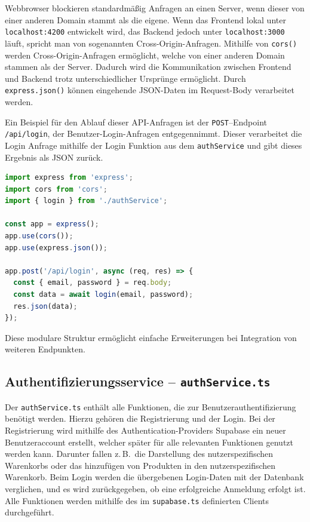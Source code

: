 \documentclass[oneside]{ausarbeitung}
\begin{document}
Webbrowser blockieren standardmäßig Anfragen an einen Server, wenn dieser von einer anderen Domain stammt als die eigene. Wenn das Frontend lokal unter \texttt{localhost:4200} entwickelt wird, das Backend jedoch unter \texttt{localhost:3000} läuft, spricht man von sogenannten Cross-Origin-Anfragen.
Mithilfe von \texttt{cors()} werden Cross-Origin-Anfragen ermöglicht, welche von einer anderen Domain stammen als der Server. Dadurch wird die Kommunikation zwischen Frontend und Backend trotz unterschiedlicher Ursprünge ermöglicht.
Durch \texttt{express.json()} können eingehende JSON-Daten im Request-Body verarbeitet werden.

Ein Beispiel für den Ablauf dieser API-Anfragen ist der \texttt{POST}–Endpoint \texttt{/api/login}, der Benutzer-Login-Anfragen entgegennimmt. Dieser verarbeitet die Login Anfrage mithilfe der Login Funktion aus dem \texttt{authService} und gibt dieses Ergebnis als JSON zurück. 


\begin{lstlisting}[language=TypeScript, caption={Auszug aus \texttt{server.ts}}]
import express from 'express';
import cors from 'cors';
import { login } from './authService';

const app = express();
app.use(cors());
app.use(express.json());

app.post('/api/login', async (req, res) => {
  const { email, password } = req.body;
  const data = await login(email, password);
  res.json(data);
});
\end{lstlisting}

Diese modulare Struktur ermöglicht einfache Erweiterungen bei Integration von weiteren Endpunkten. 

\subsection{Authentifizierungsservice – \texttt{authService.ts}}

Der \texttt{authService.ts} enthält alle Funktionen, die zur Benutzerauthentifizierung benötigt werden. Hierzu gehören die Registrierung und der Login. Bei der Registrierung wird mithilfe des Authentication-Providers Supabase ein neuer Benutzeraccount erstellt, welcher später für alle relevanten Funktionen genutzt werden kann. Darunter fallen z.\,B.\ die Darstellung des nutzerspezifischen Warenkorbs oder das hinzufügen von Produkten in den nutzerspezifischen Warenkorb. Beim Login werden die übergebenen Login-Daten mit der Datenbank verglichen, und es wird zurückgegeben, ob eine erfolgreiche Anmeldung erfolgt ist.
Alle Funktionen werden mithilfe des im \texttt{supabase.ts} definierten Clients durchgeführt.
\end{document}
